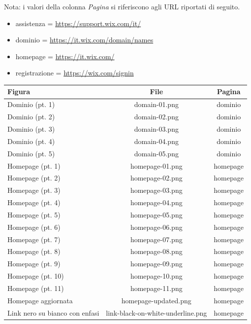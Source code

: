 \documentclass[11pt,a4paper]{article}
\begin{document}
Nota: i valori della colonna \textit{Pagina} si riferiscono agli URL
riportati di seguito.

\begin{itemize}
  \item assistenza = \url{https://support.wix.com/it/}
  \item dominio = \url{https://it.wix.com/domain/names}
  \item homepage = \url{https://it.wix.com/}
  \item registrazione = \url{https://wix.com/signin}
\end{itemize}

\begin{table}[]
  \centering
  \begin{tabular}{||p{4cm}|c|c||}
    \hline
    \textbf{Figura} & \textbf{File} & \textbf{Pagina} \\
    \hline\hline
     Dominio (pt. 1) & domain-01.png & dominio \\
     Dominio (pt. 2) & domain-02.png & dominio \\
     Dominio (pt. 3) & domain-03.png & dominio \\
     Dominio (pt. 4) & domain-04.png & dominio \\
     Dominio (pt. 5) & domain-05.png & dominio \\
     Homepage (pt. 1) & homepage-01.png & homepage \\
     Homepage (pt. 2) & homepage-02.png & homepage \\
     Homepage (pt. 3) & homepage-03.png & homepage \\
     Homepage (pt. 4) & homepage-04.png & homepage \\
     Homepage (pt. 5) & homepage-05.png & homepage \\
     Homepage (pt. 6) & homepage-06.png & homepage \\
     Homepage (pt. 7) & homepage-07.png & homepage \\
     Homepage (pt. 8) & homepage-08.png & homepage \\
     Homepage (pt. 9) & homepage-09.png & homepage \\
     Homepage (pt. 10) & homepage-10.png & homepage \\
     Homepage (pt. 11) & homepage-11.png & homepage \\
     Homepage aggiornata & homepage-updated.png & homepage \\
     Link nero su bianco con enfasi & link-black-on-white-underline.png & homepage \\

\end{tabular}
\end{table}
\end{document}
